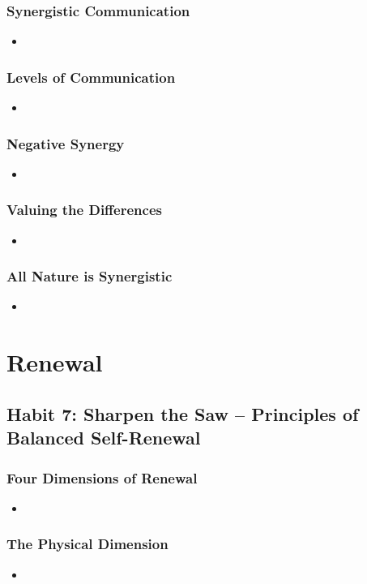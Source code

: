 \documentclass[11pt]{article}
\begin{document}
\subsubsection{Synergistic Communication}
\begin{itemize}
\item 
\end{itemize}
\subsubsection{Levels of Communication}
\begin{itemize}
\item 
\end{itemize}
\subsubsection{Negative Synergy}
\begin{itemize}
\item 
\end{itemize}
\subsubsection{Valuing the Differences}
\begin{itemize}
\item 
\end{itemize}
\subsubsection{All Nature is Synergistic}
\begin{itemize}
\item 
\end{itemize}
\section{Renewal}
\subsection{Habit 7: Sharpen the Saw -- Principles of Balanced Self-Renewal}
\subsubsection{Four Dimensions of Renewal}
\begin{itemize}
\item 
\end{itemize}
\subsubsection{The Physical Dimension}
\begin{itemize}
\item 
\end{itemize}
\end{document}
